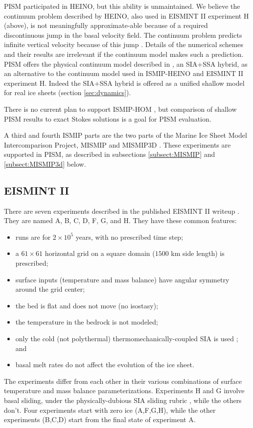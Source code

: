 PISM participated in HEINO, but this ability is unmaintained.   We believe the continuum problem described by HEINO, also used in EISMINT II experiment H (above), is not meaningfully approximate-able because of a required discontinuous jump in the basal velocity field.  The continuum problem predicts infinite vertical velocity because of this jump \cite[Appendix B]{BBssasliding}.  Details of the numerical schemes and their results are irrelevant if the continuum model makes such a prediction.  PISM offers the physical continuum model described in \cite{BBssasliding}, an SIA+SSA hybrid, as an alternative to the continuum model used in ISMIP-HEINO and EISMINT II experiment H.  Indeed the SIA+SSA hybrid is offered as a unified shallow model for real ice sheets (section \ref{sec:dynamics}).

There is no current plan to support ISMIP-HOM \cite{ISMIPHOM,HOMelmer}, but comparison of shallow PISM results to exact Stokes solutions is a goal for PISM evaluation.

A third and fourth ISMIP parts are the two parts of the Marine Ice Sheet Model Intercomparison Project, MISMIP \cite{MISMIP2012} and MISMIP3D \cite{MISMIP3d2013}.  These experiments are supported in PISM, as described in subsections \ref{subsect:MISMIP} and \ref{subsect:MISMIP3d} below.


\subsection{EISMINT II}\label{subsect:EISMINTII}

There are seven experiments described in the published EISMINT II writeup \cite{EISMINT00}.  They are named A, B, C, D, F, G, and H.  They have these common features:\begin{itemize}
\item runs are for $2\times 10^5$ years, with no prescribed time step;
\item a $61\times 61$ horizontal grid on a square domain ($1500$ km side length) is prescribed;
\item surface inputs (temperature and mass balance) have angular symmetry around the grid center;
\item the bed is flat and does not move (no isostasy);
\item the temperature in the bedrock is not modeled;
\item only the cold (not polythermal) thermomechanically-coupled SIA is used \cite{EISMINT00}; and
\item basal melt rates do not affect the evolution of the ice sheet.
\end{itemize}
The experiments differ from each other in their various combinations of surface temperature and mass balance parameterizations.  Experiments H and G involve basal sliding, under the physically-dubious SIA sliding rubric \cite[Appendix B]{BBssasliding}, while the others don't.  Four experiments start with zero ice (A,F,G,H), while the other experiments (B,C,D) start from the final state of experiment A.

